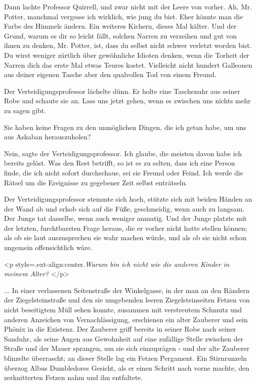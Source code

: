 Dann lachte Professor Quirrell, und zwar nicht mit der Leere von vorher. \glqq
Ah, Mr. Potter, manchmal vergesse ich wirklich, wie jung du bist. Eher könnte
man die Farbe des Himmels ändern.\grqq{} Ein weiteres Kichern, dieses Mal
kälter. \glqq{}Und der Grund, warum es dir so leicht fällt, solchen Narren zu
verzeihen und gut von ihnen zu denken, Mr. Potter, ist, dass du selbst nicht
schwer verletzt worden bist. Du wirst weniger zärtlich über gewöhnliche Idioten
denken, wenn die Torheit der Narren dich das erste Mal etwas Teures kostet.
Vielleicht nicht hundert Galleonen aus deiner eigenen Tasche aber den qualvollen
Tod von einem Freund.\grqq{}

Der Verteidigungsprofessor lächelte dünn. Er holte eine Taschenuhr aus seiner
Robe und schaute sie an. \glqq{}Lass uns jetzt gehen, wenn es zwischen uns nichts
mehr zu sagen gibt.\grqq{}

\glqq{}Sie haben keine Fragen zu den unmöglichen Dingen, die ich getan habe, um
uns aus Askaban herauszuholen?\grqq{}

\glqq{}Nein\grqq{}, sagte der Verteidigungsprofessor. \glqq{}Ich glaube, die
meisten davon habe ich bereits gelöst. Was den Rest betrifft, so ist es zu
selten, dass ich eine Person finde, die ich nicht sofort durchschaue, sei sie
Freund oder Feind. Ich werde die Rätsel um die Ereignisse zu gegebener Zeit
selbst enträtseln.\grqq{}

Der Verteidigungsprofessor stemmte sich hoch, stützte sich mit beiden Händen an
der Wand ab und erhob sich auf die Füße, geschmeidig, wenn auch zu langsam. Der
Junge tat dasselbe, wenn auch weniger anmutig. Und der Junge platzte mit der
letzten, furchtbarsten Frage heraus, die er vorher nicht hatte stellen können;
als ob sie laut auszusprechen sie wahr machen würde, und als ob sie nicht schon
ungemein offensichtlich wäre.

<p style=\grqq{}.ext-align:center\grqq{}.\emph{\glqq{}Warum bin ich nicht wie die
anderen Kinder in meinem Alter?\grqq{}} </p>

... In einer verlassenen Seitenstraße der Winkelgasse, in der man an den Rändern
der Ziegelsteinstraße und den sie umgebenden leeren Ziegelsteinseiten Fetzen von
nicht beseitigtem Müll sehen konnte, zusammen mit verstreutem Schmutz und
anderen Anzeichen von Vernachlässigung, erschienen ein alter Zauberer und sein
Phönix in die Existenz. Der Zauberer griff bereits in seiner Robe nach seiner
Sanduhr, als seine Augen aus Gewohnheit auf eine zufällige Stelle zwischen der
Straße und der Mauer sprangen, um sie sich einzuprägen - und der alte Zauberer
blinzelte überrascht; an dieser Stelle lag ein Fetzen Pergament. Ein
Stirnrunzeln überzog Albus Dumbledores Gesicht, als er einen Schritt nach vorne
machte, den zerknitterten Fetzen nahm und ihn entfaltete.

